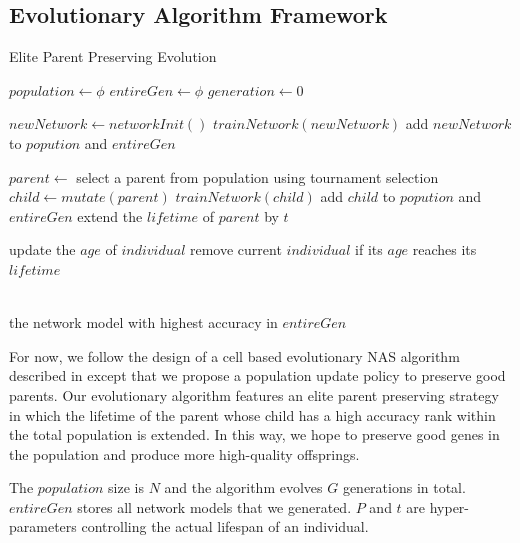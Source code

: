 \documentclass[conference]{IEEEtran}
\begin{document}
\subsection{Evolutionary Algorithm Framework}

\begin{algorithm}[H]  
  \caption{ Elite Parent Preserving Evolution}
  \begin{algorithmic}[1]  

  \State $population\gets \phi$
  \State $entireGen\gets \phi$
  \State $generation\gets 0$
  
  \State $newNetwork\gets networkInit()$
  \State $trainNetwork(newNetwork)$
  \State add $newNetwork$ to $popution$ and $entireGen$
  \EndWhile
  

  
    \State $parent\gets$ select a parent from population using tournament selection 
    \State $child \gets mutate(parent)$
    \State $trainNetwork(child)$
    \State add $child$ to $popution$ and $entireGen$
      \State extend the $lifetime$ of $parent$ by $t$
    \EndIf
    
      \State update the $age$ of $individual$
      \State remove current $individual$ if its $ age $ reaches its $lifetime$
    \EndFor
    
    
  \EndWhile
  
  
  \\  
  \Return the network model with highest accuracy in $entireGen$

\end{algorithmic}  
\end{algorithm}  
For now, we follow the design of a cell based evolutionary NAS algorithm described in\cite{DBLP:journals/corr/abs-1802-01548} except that we propose a population update policy to preserve good parents. 
Our evolutionary algorithm features an elite parent preserving strategy in which the lifetime of the parent whose child has a high accuracy rank within the total population is extended. In this way, we hope to preserve good genes in the population and produce more high-quality offsprings.

The $population$ size is $N$ and the algorithm evolves $G$ generations in total. $entireGen$ stores all network models that we generated. $P$ and $t$ are hyper-parameters controlling the actual lifespan of an individual.
   
\end{document}
